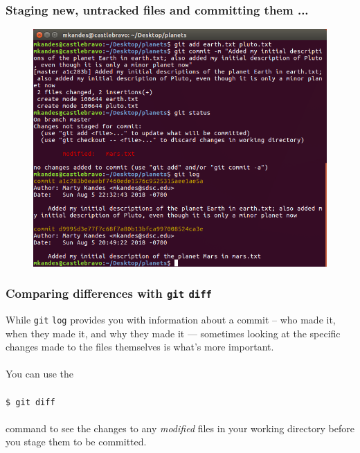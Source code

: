 \documentclass{beamer}
\begin{document}
\begin{frame}
   \frametitle{Staging new, untracked files and committing them ...}
   \begin{figure}[htbp]
      \includegraphics[width=1.0\textwidth]{images/git-add-and-commit-more-new-files.png}
   \end{figure}
\end{frame}

\begin{frame}
   \frametitle{Comparing differences with \texttt{git} \texttt{diff}}
   While \texttt{git} \texttt{log} provides you with information about a 
   commit -- who made it, when they made it, and why they made it --- 
   sometimes looking at the specific changes made to the files themselves 
   is what's more important.
   \\ \ \\
   You can use the 
   \\ \ \\
   \texttt{\hspace{1.0em}\$ git diff}
   \\ \ \\
   command to see the changes to any \textit{modified} files in your working 
   directory before you stage them to be committed.
\end{frame}
\end{document}
